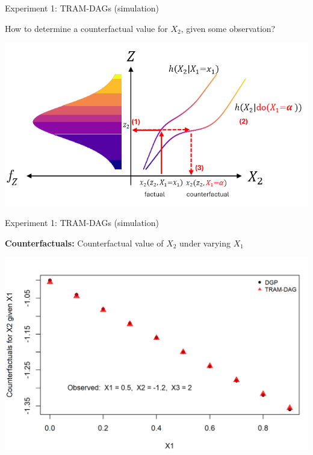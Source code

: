 \documentclass[onlytextwidth,english]{beamer}\usepackage[]{graphicx}\usepackage[]{xcolor}
\begin{document}
\begin{frame}{Experiment 1: TRAM-DAGs (simulation)}

How to determine a counterfactual value for $X_2$, given some observation?

  \centering
  \includegraphics[width=0.95\linewidth]{img/experiment1/counterfactuals.png}

\end{frame}






\begin{frame}{Experiment 1: TRAM-DAGs (simulation)}

\textbf{Counterfactuals:} Counterfactual value of $X_2$ under varying $X_1$

  \centering
  \includegraphics[width=0.9\linewidth]{img/experiment1/exp1_counterfactuals.png}

\end{frame}
\end{document}
